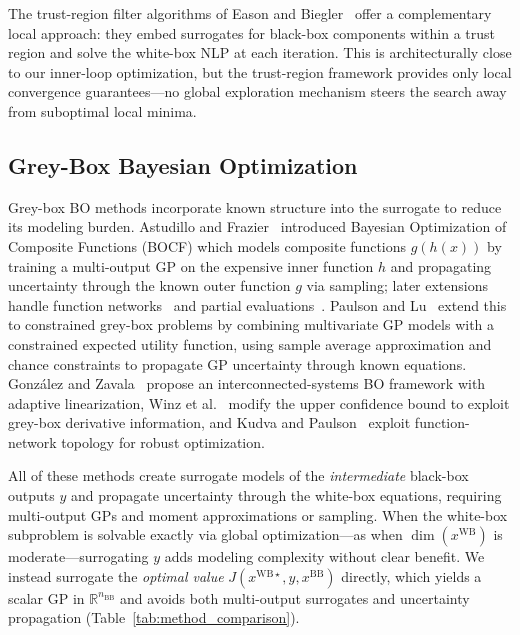 \documentclass[12pt,a4paper]{article}%
\theoremstyle{plain}%
\theoremstyle{remark}%
\theoremstyle{definition}%
\def\WB{\mathrm{WB}}
\def\BB{\mathrm{BB}}
\begin{document}
The trust-region filter algorithms of Eason and Biegler~\cite{eason2016trf,eason2018trf} offer a complementary local approach: they embed surrogates for black-box components within a trust region and solve the white-box NLP at each iteration. This is architecturally close to our inner-loop optimization, but the trust-region framework provides only local convergence guarantees---no global exploration mechanism steers the search away from suboptimal local minima.

\subsection{Grey-Box Bayesian Optimization}

Grey-box BO methods incorporate known structure into the surrogate to reduce its modeling burden. Astudillo and Frazier~\cite{astudillo2019bocf} introduced Bayesian Optimization of Composite Functions (BOCF) which models composite functions $g(h(x))$ by training a multi-output GP on the expensive inner function $h$ and propagating uncertainty through the known outer function $g$ via sampling; later extensions handle function networks~\cite{astudillo2021bofn} and partial evaluations~\cite{buathong2024partial}. Paulson and Lu~\cite{paulson2022cobalt} extend this to constrained grey-box problems by combining multivariate GP models with a constrained expected utility function, using sample average approximation and chance constraints to propagate GP uncertainty through known equations. Gonz\'{a}lez and Zavala~\cite{gonzalez2024bois} propose an interconnected-systems BO framework with adaptive linearization, Winz et al.~\cite{winz2025greybox} modify the upper confidence bound to exploit grey-box derivative information, and Kudva and Paulson~\cite{kudva2025bonsai} exploit function-network topology for robust optimization.

All of these methods create surrogate models of the \emph{intermediate} black-box outputs $y$ and propagate uncertainty through the white-box equations, requiring multi-output GPs and moment approximations or sampling. When the white-box subproblem is solvable exactly via global optimization---as when $\dim(x^{\WB})$ is moderate---surrogating $y$ adds modeling complexity without clear benefit. We instead surrogate the \emph{optimal value} $J(x^{\WB\star}, y, x^{\BB})$ directly, which yields a scalar GP in $\mathbb{R}^{n_{\BB}}$ and avoids both multi-output surrogates and uncertainty propagation (Table~\ref{tab:method_comparison}).
\end{document}
